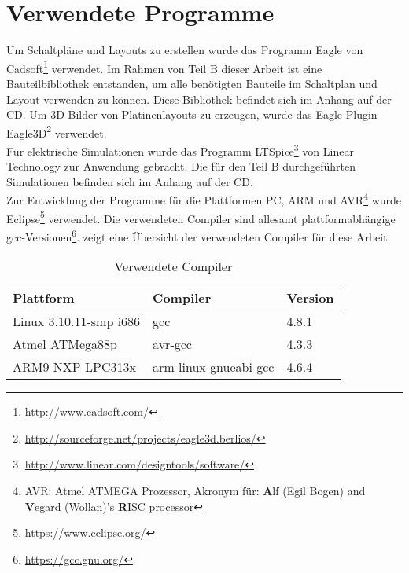 \section{Verwendete Programme}
Um Schaltpläne und Layouts zu erstellen wurde das Programm Eagle von Cadsoft\footnote{\url{http://www.cadsoft.com/}} verwendet. Im Rahmen von Teil B dieser Arbeit ist eine Bauteilbibliothek entstanden, um alle benötigten Bauteile im Schaltplan und Layout verwenden zu können. Diese Bibliothek befindet sich im Anhang auf der CD.
Um 3D Bilder von Platinenlayouts zu erzeugen, wurde das Eagle Plugin Eagle3D\footnote{\url{http://sourceforge.net/projects/eagle3d.berlios/}} verwendet.\\
Für elektrische Simulationen wurde das Programm LTSpice\footnote{\url{http://www.linear.com/designtools/software/}} von Linear Technology zur Anwendung gebracht. Die für den Teil B durchgeführten Simulationen befinden sich im Anhang auf der CD.\\
Zur Entwicklung der Programme für die Plattformen PC, ARM und AVR\footnote{AVR: Atmel ATMEGA Prozessor, Akronym für: \textbf{A}lf (Egil Bogen) and \textbf{V}egard (Wollan)'s \textbf{R}ISC processor} wurde Eclipse\footnote{\url{https://www.eclipse.org/}} verwendet. Die verwendeten Compiler sind allesamt plattformabhängige gcc-Versionen\footnote{\url{https://gcc.gnu.org/}}.  zeigt eine Übersicht der verwendeten Compiler für diese Arbeit.

\begin{table}[h]
\begin{tabular}{|p{4.5cm}|p{4cm}|p{4cm}|}\hline
\rowcolor{TableBackgroundColor} 
\textbf{Plattform}		&	\textbf{Compiler}		&	\textbf{Version}  \\ \hline
 Linux 3.10.11-smp i686	&	gcc						& 4.8.1	\\ \hline
 Atmel ATMega88p		&	avr-gcc					& 4.3.3	\\ \hline
 ARM9 NXP LPC313x		&	arm-linux-gnueabi-gcc	& 4.6.4	\\ \hline
\end{tabular}
\caption{Verwendete Compiler}
\label{tab:verwendete_compiler}
\end{table}
